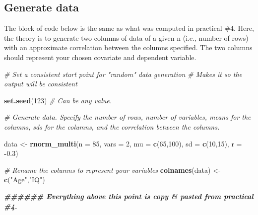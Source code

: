 \documentclass[
]{book}
\newenvironment{Shaded}{\begin{snugshade}}{\end{snugshade}}
\newcommand{\AttributeTok}[1]{\textcolor[rgb]{0.13,0.29,0.53}{#1}}
\newcommand{\CommentTok}[1]{\textcolor[rgb]{0.56,0.35,0.01}{\textit{#1}}}
\newcommand{\ConstantTok}[1]{\textcolor[rgb]{0.56,0.35,0.01}{#1}}
\newcommand{\DecValTok}[1]{\textcolor[rgb]{0.00,0.00,0.81}{#1}}
\newcommand{\DocumentationTok}[1]{\textcolor[rgb]{0.56,0.35,0.01}{\textbf{\textit{#1}}}}
\newcommand{\FloatTok}[1]{\textcolor[rgb]{0.00,0.00,0.81}{#1}}
\newcommand{\FunctionTok}[1]{\textcolor[rgb]{0.13,0.29,0.53}{\textbf{#1}}}
\newcommand{\NormalTok}[1]{#1}
\newcommand{\OtherTok}[1]{\textcolor[rgb]{0.56,0.35,0.01}{#1}}
\newcommand{\SpecialCharTok}[1]{\textcolor[rgb]{0.81,0.36,0.00}{\textbf{#1}}}
\newcommand{\StringTok}[1]{\textcolor[rgb]{0.31,0.60,0.02}{#1}}
\begin{document}
\begin{Shaded}
\end{Shaded}

\subsection*{Generate data}\label{generate-data-1}

The block of code below is the same as what was computed in practical \#4. Here, the theory is to generate two columns of data of a given n (i.e., number of rows) with an approximate correlation between the columns specified. The two columns should represent your chosen covariate and dependent variable.

\begin{Shaded}
\begin{Highlighting}[]
\CommentTok{\# Set a consistent start point for "random" data generation}
\CommentTok{\# Makes it so the output will be consistent}

\FunctionTok{set.seed}\NormalTok{(}\DecValTok{123}\NormalTok{) }\CommentTok{\# Can be any value. }

\CommentTok{\# Generate data. Specify the number of rows, number of variables, means for the columns, sd\textquotesingle{}s for the columns, and the correlation between the columns.}

\NormalTok{data }\OtherTok{\textless{}{-}} \FunctionTok{rnorm\_multi}\NormalTok{(}\AttributeTok{n =} \DecValTok{85}\NormalTok{, }\AttributeTok{vars =} \DecValTok{2}\NormalTok{, }\AttributeTok{mu =} \FunctionTok{c}\NormalTok{(}\DecValTok{65}\NormalTok{,}\DecValTok{100}\NormalTok{), }\AttributeTok{sd =} \FunctionTok{c}\NormalTok{(}\DecValTok{10}\NormalTok{,}\DecValTok{15}\NormalTok{), }\AttributeTok{r =} \SpecialCharTok{{-}}\FloatTok{0.3}\NormalTok{)}

\CommentTok{\# Rename the columns to represent your variables }
\FunctionTok{colnames}\NormalTok{(data) }\OtherTok{\textless{}{-}} \FunctionTok{c}\NormalTok{(}\StringTok{"Age"}\NormalTok{,}\StringTok{"IQ"}\NormalTok{)}

\DocumentationTok{\#\#\#\#\#\# Everything above this point is copy \& pasted from practical \#4. }
\end{Highlighting}
\end{Shaded}
\end{document}
